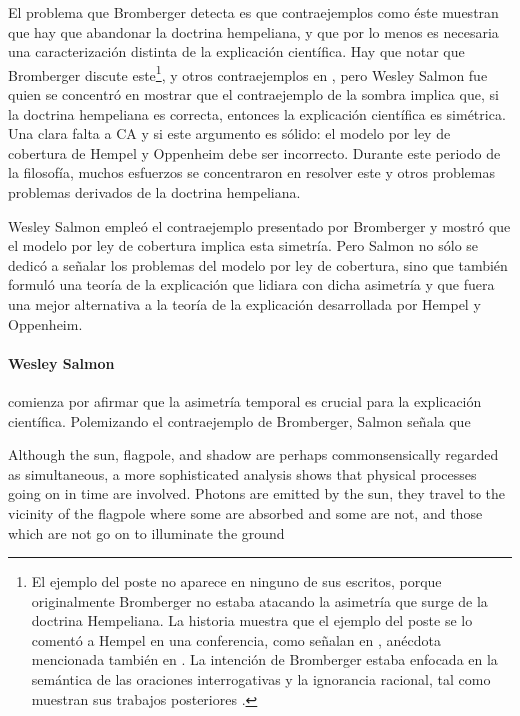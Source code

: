 El problema que Bromberger detecta es que
contraejemplos como éste muestran que hay que
abandonar la doctrina hempeliana, y que por lo menos
es necesaria una caracterización distinta de la
explicación científica. Hay que notar que Bromberger
discute este\footnote{
	El ejemplo del poste no aparece en ninguno de sus
	escritos, porque	originalmente Bromberger no
	estaba atacando la asimetría que surge de	la
	doctrina Hempeliana. La historia muestra que el
	ejemplo del poste se lo comentó a Hempel	en una
	conferencia, como señalan en \parencite{
	mitBromberger  }, anécdota mencionada también en
	\parencite[ p.~81 ]{ Dewulf2022 }. La intención de
	Bromberger estaba enfocada en la semántica de las
	oraciones	interrogativas y la ignorancia
	racional, tal como muestran sus trabajos
	posteriores \parencite{ Bromberger1992 }.
},
y otros contraejemplos en \parencite{ Bromberger1966 },
pero Wesley Salmon fue quien se concentró en mostrar
que el contraejemplo de la sombra implica que, si la
doctrina hempeliana es correcta, entonces la explicación
científica es simétrica. Una clara falta a CA y si este
argumento es sólido: el modelo por ley de cobertura de
Hempel y Oppenheim debe ser incorrecto. Durante este
periodo de la filosofía, muchos esfuerzos se concentraron
en resolver este y otros problemas problemas derivados de
la doctrina hempeliana.

Wesley Salmon empleó el contraejemplo presentado por
Bromberger y mostró que el modelo por ley de cobertura implica
esta simetría. Pero Salmon no sólo se dedicó a señalar los
problemas del modelo por ley de cobertura, sino que también
formuló una teoría de la explicación que lidiara con dicha
asimetría y que fuera una mejor alternativa a la teoría de
la explicación desarrollada por Hempel y Oppenheim.

\paragraph{ Wesley Salmon \parencite{ Salmon1970 } }
comienza por afirmar que la asimetría temporal es crucial
para la explicación científica. Polemizando el
contraejemplo de Bromberger, Salmon señala que

\begin{ quote }
	Although the sun, flagpole, and shadow are perhaps
	commonsensically regarded as simultaneous, a more
	sophisticated analysis shows that physical processes
    going on in time are involved.	Photons are emitted by
	the sun, they travel to the	vicinity of the flagpole where
    some are absorbed and some are	not, and those which are
    not go on to  illuminate the ground \parencite[ p.~72 ]{ Salmon1970 }
\end{ quote }

